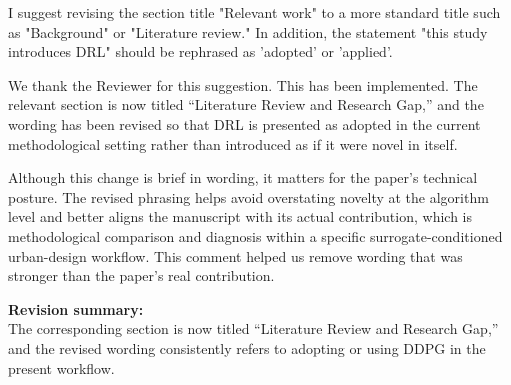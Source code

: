 \begin{ReviewerComment}
I suggest revising the section title "Relevant work" to a more standard title such as "Background" or "Literature review." In addition, the statement "this study introduces DRL" should be rephrased as 'adopted' or 'applied'.
\end{ReviewerComment}
%
\begin{Answer}
We thank the Reviewer for this suggestion. This has been implemented. The relevant section is now titled ``Literature Review and Research Gap,'' and the wording has been revised so that DRL is presented as adopted in the current methodological setting rather than introduced as if it were novel in itself.

Although this change is brief in wording, it matters for the paper's technical posture. The revised phrasing helps avoid overstating novelty at the algorithm level and better aligns the manuscript with its actual contribution, which is methodological comparison and diagnosis within a specific surrogate-conditioned urban-design workflow. This comment helped us remove wording that was stronger than the paper's real contribution.
\end{Answer}
\begin{RevisionExcerpt}
\noindent\textbf{Revision summary:}\\
The corresponding section is now titled ``Literature Review and Research Gap,'' and the revised wording consistently refers to adopting or using DDPG in the present workflow.
\end{RevisionExcerpt}

